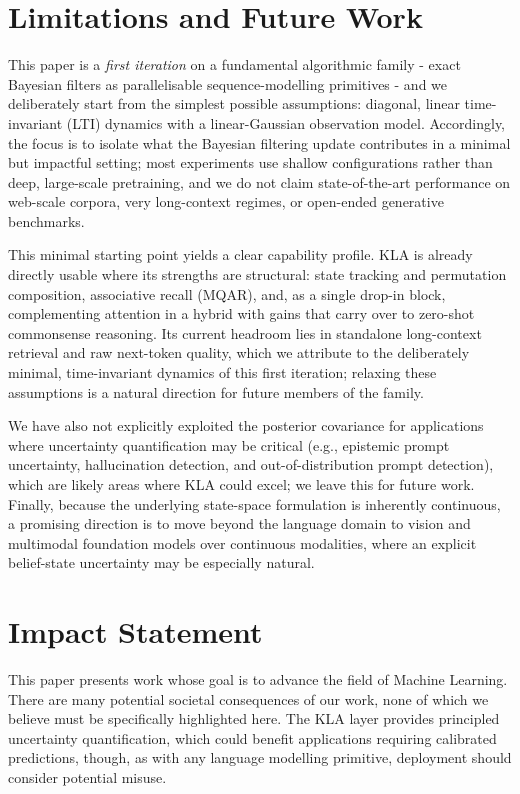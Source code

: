 \documentclass{article}
\newcommand{\our}{\textsc{KLA}\xspace}
\begin{document}
\section{Limitations and Future Work}
\label{sec:limitations}
This paper is a \emph{first iteration} on a fundamental algorithmic family - exact Bayesian filters as parallelisable sequence-modelling primitives - and we deliberately start from the simplest possible assumptions: diagonal, linear time-invariant (LTI) dynamics with a linear-Gaussian observation model. Accordingly, the focus is to isolate what the Bayesian filtering update contributes in a minimal but impactful setting; most experiments use shallow configurations rather than deep, large-scale pretraining, and we do not claim state-of-the-art performance on web-scale corpora, very long-context regimes, or open-ended generative benchmarks.

This minimal starting point yields a clear capability profile. \textsc{KLA} is already directly usable where its strengths are structural: state tracking and permutation composition, associative recall (MQAR), and, as a single drop-in block, complementing attention in a hybrid with gains that carry over to zero-shot commonsense reasoning. Its current headroom lies in standalone long-context retrieval and raw next-token quality, which we attribute to the deliberately minimal, time-invariant dynamics of this first iteration; relaxing these assumptions is a natural direction for future members of the family.

We have also not explicitly exploited the posterior covariance for applications where uncertainty quantification may be critical (e.g., epistemic prompt uncertainty, hallucination detection, and out-of-distribution prompt detection), which are likely areas where \our could excel; we leave this for future work. Finally, because the underlying state-space formulation is inherently continuous, a promising direction is to move beyond the language domain to vision and multimodal foundation models over continuous modalities, where an explicit belief-state uncertainty may be especially natural.

\section*{Impact Statement}
This paper presents work whose goal is to advance the field of Machine Learning. There are many potential societal consequences of our work, none of which we believe must be specifically highlighted here. The \our layer provides principled uncertainty quantification, which could benefit applications requiring calibrated predictions, though, as with any language modelling primitive, deployment should consider potential misuse.
\end{document}
